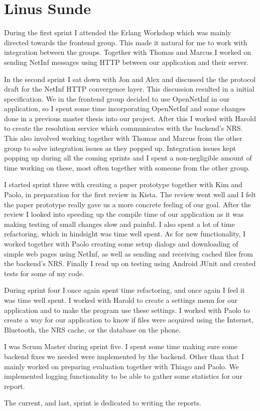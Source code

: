 \section{Linus Sunde}

During the first sprint I attended the Erlang Workshop which was mainly directed towards the frontend group. This made it natural for me to work with integration between the groups. Together with Thomas and Marcus I worked on sending NetInf messages using HTTP between our application and their server.

In the second sprint I sat down with Jon and Alex and discussed the the protocol draft for the NetInf HTTP convergence layer. This discussion resulted in a initial specification. We in the frontend group decided to use OpenNetInf in our application, so I spent some time incorporating OpenNetInf and some changes done in a previous master thesis into our project. After this I worked with Harold to create the resolution service which communicates with the backend's NRS. This also involved working together with Thomas and Marcus from the other group to solve integration issues as they popped up. Integration issues kept popping up during all the coming sprints and I spent a non-negligible amount of time working on these, most often together with someone from the other group.

I started sprint three with creating a paper prototype together with Kim and Paolo, in preparation for the first review in Kista. The review went well and I felt the paper prototype really gave us a more concrete feeling of our goal. After the review I looked into speeding up the compile time of our application as it was making testing of small changes slow and painful. I also spent a lot of time refactoring, which in hindsight was time well spent. As for new functionality, I worked together with Paolo creating some setup dialogs and downloading of simple web pages using NetInf, as well as sending and receiving cached files from the backend's NRS. Finally I read up on testing using Android JUnit and created tests for some of my code.

During sprint four I once again spent time refactoring, and once again I feel it was time well spent. I worked with Harold to create a settings menu for our application and to make the program use these settings. I worked with Paolo to create a way for our application to know if files were acquired using the Internet, Bluetooth, the NRS cache, or the database on the phone.

I was Scrum Master during sprint five. I spent some time making sure some backend fixes we needed were implemented by the backend. Other than that I mainly worked on preparing evaluation together with Thiago and Paolo. We implemented logging functionality to be able to gather some statistics for our report.

The current, and last, sprint is dedicated to writing the reports.